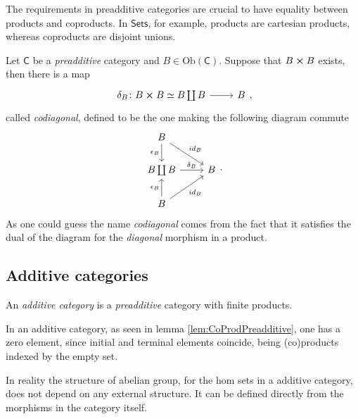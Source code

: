\documentclass[../Main]{subfiles}
\begin{document}
\begin{rem}[]
	The requirements in preadditive categories are crucial to have
	equality between products and coproducts.
	In $\mathsf{Sets}$, for example, products are cartesian products,
	whereas coproducts are disjoint unions.
\end{rem}

\begin{rem}[]
	Let $\mathsf{C}$ be a {\em preadditive} category and
	$B \in \mathrm{Ob} \left(\mathsf{C}\right)$.
	Suppose that $B \cross B$ exists, then there is a map
	\begin{equation}
		\begin{tikzcd}
			\delta_B\colon B \cross B \simeq B \coprod B \arrow[r, "", rightarrow] &
			B
		\end{tikzcd}
	,\end{equation} 
	called {\em codiagonal},
	defined to be the one making the following diagram commute
	\begin{equation}
	\begin{tikzcd}
		B \arrow[rd, "id_B", rightarrow] \arrow[d, "\epsilon_B"', rightarrow] & \\
		B \coprod B \arrow[r, "\delta_B", rightarrow] &
		B\\
		B \arrow[u, "\epsilon_B", rightarrow] \arrow[ru, "id_B"', rightarrow] 
	\end{tikzcd}
	.\end{equation} 
	As one could guess the name {\em codiagonal} comes from the fact that
	it satisfies the dual of the diagram for the {\em diagonal} morphism
	in a product.
\end{rem}

\subsection{Additive categories}
\begin{defn}
	An {\em additive category}
	is a {\em preadditive} category with finite products.
\end{defn}

\begin{rem}[]
	In an additive category, as seen in lemma \ref{lem:CoProdPreadditive}, 
	one has a zero element, since initial and terminal
	elements coincide, being (co)products indexed by the empty set.
\end{rem}

In reality the structure of abelian group, for the hom sets in a additive category,
does not depend on any external structure.
It can be defined directly from the morphisms in the category itself.
\end{document}
